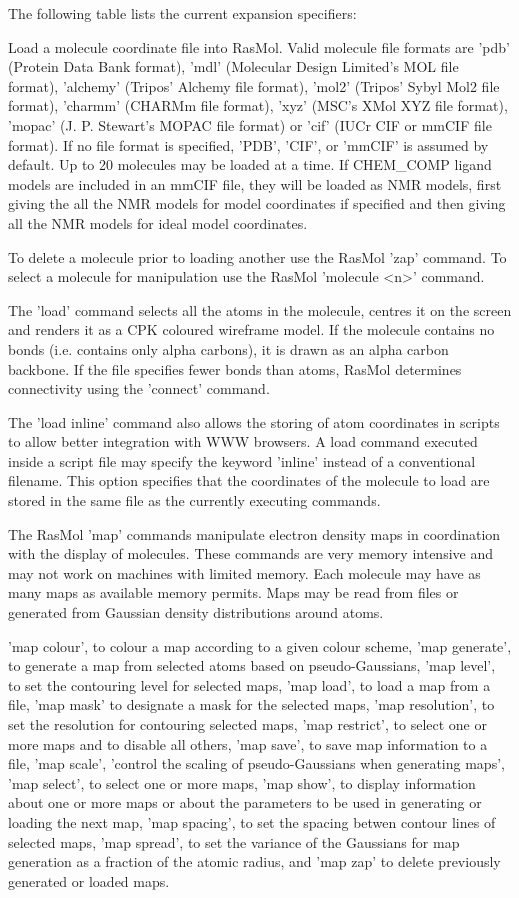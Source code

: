 The following table lists the current expansion specifiers:

Load a molecule coordinate file into RasMol. Valid molecule file
formats are
'pdb'
(Protein Data Bank format),
'mdl'
(Molecular Design Limited's MOL file format),
'alchemy'
(Tripos' Alchemy file format),
'mol2'
(Tripos' Sybyl Mol2 file format),
'charmm'
(CHARMm file format),
'xyz'
(MSC's XMol XYZ file format),
'mopac'
(J. P. Stewart's MOPAC file format) or
'cif'
(IUCr CIF or mmCIF file format). If no file format is specified,
'PDB',
'CIF',
or
'mmCIF'
is assumed by default. Up to 20 molecules may be loaded at a time.
If CHEM_COMP ligand models are included in an mmCIF file, they will be loaded
as NMR models, first giving the all the NMR models for model
coordinates if specified and then giving all the NMR models for
ideal model coordinates.

To delete a molecule prior to loading another use the RasMol
'zap'
command.  To select a molecule for manipulation use the RasMol
'molecule <n>'
command.

The
'load'
command selects all the atoms in the molecule, centres it on the
screen and renders it as a CPK coloured wireframe model. If the molecule
contains no bonds (i.e. contains only alpha carbons), it is drawn as
an alpha carbon backbone. If the file specifies fewer bonds than atoms,
RasMol determines connectivity using the
'connect'
command.

The
'load inline'
command also allows the storing of atom coordinates in scripts
to allow better integration with WWW browsers. A load command
executed inside a script file may specify the keyword
'inline'
instead of a conventional filename. This option specifies that
the coordinates of the molecule to load are stored in the same
file as the currently executing commands.

The RasMol
'map'
commands manipulate electron density maps in coordination
with the display of molecules.  These commands are very
memory intensive and may not work on machines with
limited memory.  Each molecule may have as many maps
as available memory permits.  Maps may be read from
files or generated from Gaussian density distributions
around atoms.

'map colour',
to colour a map according to a given colour scheme,
'map generate',
to generate a map from selected atoms based on pseudo-Gaussians,
'map level',
to set the contouring level for selected maps,
'map load',
to load a map from a file,
'map mask'
to designate a mask for the selected maps,
'map resolution',
to set the resolution for contouring selected maps,
'map restrict',
to select one or more maps and to disable all others,
'map save',
to save map information to a file,
'map scale',
'control the scaling of pseudo-Gaussians when generating maps',
'map select',
to select one or more maps,
'map show',
to display information about one or more maps or about the
parameters to be used in generating or loading the next map,
'map spacing',
to set the spacing betwen contour lines of selected maps,
'map spread',
to set the variance of the Gaussians for map generation as a fraction
of the atomic radius, and
'map zap'
to delete previously generated or loaded maps.

